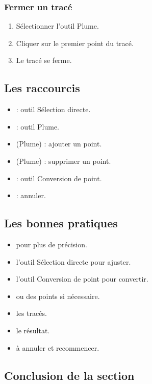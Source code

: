 \subsubsection{Fermer un tracé}

\begin{enumerate}
    \item Sélectionner l'outil Plume.
    \item Cliquer sur le premier point du tracé.
    \item Le tracé se ferme.
\end{enumerate}

\subsection{Les raccourcis}

\begin{itemize}
    \item {} : outil Sélection directe.
    \item {} : outil Plume.
    \item \terme{+} (Plume) : ajouter un point.
    \item \terme{-} (Plume) : supprimer un point.
    \item {} : outil Conversion de point.
    \item {} : annuler.
\end{itemize}

\subsection{Les bonnes pratiques}

\begin{itemize}
    \item {} pour plus de précision.
    \item {} l'outil Sélection directe pour ajuster.
    \item {} l'outil Conversion de point pour convertir.
    \item {} ou  des points si nécessaire.
    \item {} les tracés.
    \item {} le résultat.
    \item {} à annuler et recommencer.
\end{itemize}

\subsection*{Conclusion de la section}

